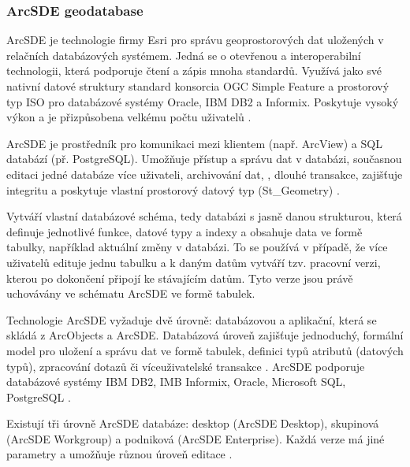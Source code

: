         \subsubsection{ArcSDE geodatabase}
        \label{kArcSDE}
        ArcSDE je technologie firmy Esri pro správu geoprostorových dat uložených v relačních databázových systémem. Jedná se o otevřenou a interoperabilní technologii, která podporuje čtení a zápis mnoha standardů. Využívá jako své nativní datové struktury standard konsorcia OGC Simple Feature a prostorový typ ISO pro databázové systémy Oracle, IBM DB2 a Informix. Poskytuje vysoký výkon a je přizpůsobena velkému počtu uživatelů \citep{Esri2006}.

ArcSDE je prostředník pro komunikaci mezi klientem (např. ArcView) a SQL databází (př. PostgreSQL). Umožňuje přístup a správu dat v databázi, současnou editaci jedné databáze více uživateli, archivování  dat, , dlouhé transakce, zajišťuje integritu a poskytuje vlastní prostorový datový typ (St\_Geometry) \citep{Law2008}. 

Vytváří vlastní databázové schéma, tedy databázi s jasně danou strukturou, která definuje jednotlivé funkce, datové typy a indexy a obsahuje data ve formě tabulky, například aktuální změny v databázi. To se používá v případě, že více uživatelů edituje jednu tabulku a k daným datům vytváří tzv. pracovní verzi, kterou po dokončení připojí ke stávajícím datům. Tyto verze jsou právě uchovávány ve schématu ArcSDE ve formě tabulek. 

Technologie ArcSDE vyžaduje dvě úrovně: databázovou a aplikační, která se skládá z ArcObjects a ArcSDE. Databázová úroveň zajišťuje jednoduchý, formální model pro uložení a správu dat ve formě tabulek, definici typů atributů (datových typů), zpracování dotazů či víceuživatelské transakce \citep{Law2008}. ArcSDE podporuje databázové systémy IBM DB2, IMB Informix, Oracle, Microsoft SQL, PostgreSQL \citep{Esri2013a}.

Existují tři úrovně ArcSDE databáze: desktop (ArcSDE Desktop), skupinová (ArcSDE Workgroup) a podniková (ArcSDE Enterprise). Každá verze má jiné parametry a umožňuje různou úroveň editace .

